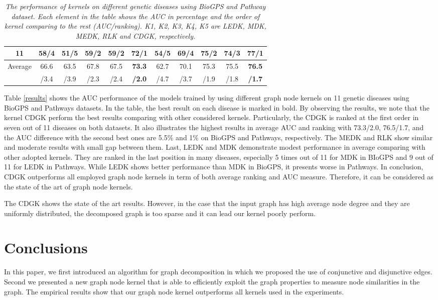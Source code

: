 \documentclass{esannV2}
\begin{document}
\begin{table}[H]
\begin{tabular}{|c|c|c|c|c|c|c|c|c|c|c|}
 11		& 58/4 & 51/5 & 59/2 & 59/2 & \textbf{72/1} 
 & 54/5 & 69/4 & 75/2 & 74/3 & \textbf{77/1} \\ [0.5ex]

 \hline 
Average & 66.6 & 63.5 & 67.8 & 67.5 & \textbf{73.3 }
 & 62.7 & 70.1 & 75.3 & 75.5 & \textbf{76.5} \\ [0.5ex]

 & /3.4 & /3.9 & /2.3 & /2.4	& \textbf{/2.0}
 & /4.7 & /3.7 & /1.9 & /1.8 & \textbf{/1.7 }\\ [0.5ex]
 \hline 
\end{tabular}
\caption{\textit{The performance of kernels on different genetic diseases using BioGPS and Pathway dataset. Each element in the table shows the AUC in percentage and the order of kernel comparing to the rest (AUC/ranking). K1, K2, K3, K4, K5 are LEDK, MDK, MEDK, RLK and CDGK, respectively.}}
\end{table}

Table \ref{results} shows the AUC performance of the models trained by using different graph node kernels on 11 genetic diseases using BioGPS and Pathways datasets. In the table, the best result on each disease is marked in bold. By observing the results, we note that the kernel CDGK perform the best results comparing with other considered kernels. Particularly, the CDGK is ranked at the first order in seven out of 11 diseases on both datasets. It also illustrates the highest results in average AUC and ranking with 73.3/2.0, 76.5/1.7, and the AUC difference with the second best ones are 5.5$\%$ and 1$\%$ on BioGPS and Pathways, respectively. The MEDK and RLK show similar and moderate results with small gap between them. Last, LEDK and MDK demonstrate modest performance in average comparing with other adopted kernels. They are ranked in the last position in many diseases, especially 5 times out of 11 for MDK in BIoGPS and 9 out of 11 for LEDK in Pathways. While LEDK shows better performance than MDK in BioGPS, it presents worse in Pathways. In conclusion, CDGK outperforms all employed graph node kernels in term of both average ranking and AUC measure. Therefore, it can be considered as the state of the art of graph node kernels.

The CDGK shows the state of the art results. However, in the case that the input graph has high average node degree and they are uniformly distributed, the decomposed graph is too sparse and it can lead our kernel poorly perform.
\section{Conclusions}
\label{conclusions}
In this paper, we first introduced an algorithm for graph decomposition in which we proposed the use of conjunctive and disjunctive edges. Second we presented a new graph node kernel that is able to efficiently exploit the graph properties to measure node similarities in the graph. The empirical results show that our graph node kernel outperforms all kernels used in the experiments. 
\end{document}
